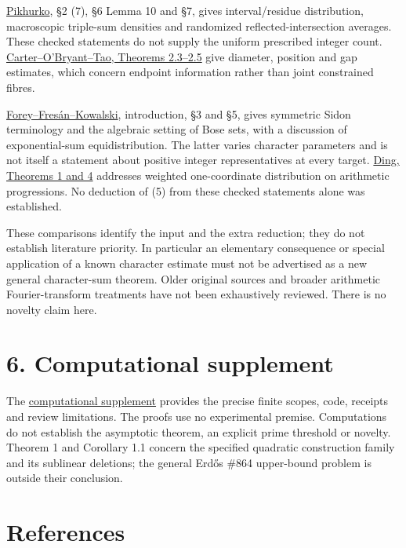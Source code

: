 \documentclass[11pt,a4paper]{article}
\begin{document}
\href{https://opikhurko.warwick.ac.uk/E/Pikhurko06dm.pdf}{Pikhurko}, §2 (7), §6 Lemma 10 and §7, gives interval/residue distribution, macroscopic triple-sum densities and randomized reflected-intersection averages. These checked statements do not supply the uniform prescribed integer count. \href{https://arxiv.org/pdf/2610.36207v1}{Carter--O'Bryant--Tao, Theorems 2.3--2.5} give diameter, position and gap estimates, which concern endpoint information rather than joint constrained fibres.

\href{https://arxiv.org/pdf/2301.12878v3}{Forey--Fresán--Kowalski}, introduction, §3 and §5, gives symmetric Sidon terminology and the algebraic setting of Bose sets, with a discussion of exponential-sum equidistribution. The latter varies character parameters and is not itself a statement about positive integer representatives at every target. \href{https://arxiv.org/pdf/2606.15041v2}{Ding, Theorems 1 and 4} addresses weighted one-coordinate distribution on arithmetic progressions. No deduction of (5) from these checked statements alone was established.

These comparisons identify the input and the extra reduction; they do not establish literature priority. In particular an elementary consequence or special application of a known character estimate must not be advertised as a new general character-sum theorem. Older original sources and broader arithmetic Fourier-transform treatments have not been exhaustively reviewed. There is no novelty claim here.

\section{6. Computational supplement}\label{computational-supplement}

The \href{https://github.com/miyosep/erdos-864-c021/blob/main/manuscript/notes/c021_editorial_20261105/COMPUTATIONAL_SUPPLEMENT.md}{computational supplement} provides the precise finite scopes, code, receipts and review limitations. The proofs use no experimental premise. Computations do not establish the asymptotic theorem, an explicit prime threshold or novelty. Theorem 1 and Corollary 1.1 concern the specified quadratic construction family and its sublinear deletions; the general Erdős \#864 upper-bound problem is outside their conclusion.

\sloppy\section{References}\label{references}
\end{document}

